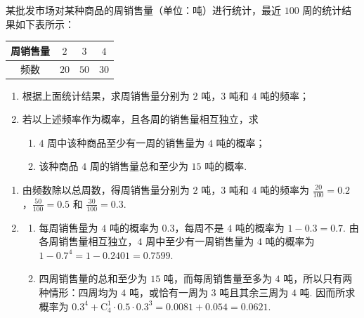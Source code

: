 \begin{problem}
某批发市场对某种商品的周销售量（单位：吨）进行统计，最近 \(100\text{ 周}\)的统计结果如下表所示：

\begin{center}
\begin{tabular}{c|ccc}
\hline
周销售量 & \(2\) & \(3\) & \(4\) \\
\hline
频数 & \(20\) & \(50\) & \(30\) \\
\hline
\end{tabular}
\end{center}

\begin{enumerate}
\item 根据上面统计结果，求周销售量分别为 \(2\text{ 吨}\)，\(3\text{ 吨}\)和 \(4\text{ 吨}\)的频率；
\item 若以上述频率作为概率，且各周的销售量相互独立，求
\begin{enumerate}
\item \(4\text{ 周}\)中该种商品至少有一周的销售量为 \(4\text{ 吨}\)的概率；
\item 该种商品 \(4\text{ 周}\)的销售量总和至少为 \(15\text{ 吨}\)的概率.
\end{enumerate}
\end{enumerate}
\end{problem}

\begin{solution}
\begin{enumerate}
\item 由频数除以总周数，得周销售量分别为 \(2\text{ 吨}\)，\(3\text{ 吨}\)和 \(4\text{ 吨}\)的频率为 \(\frac{20}{100}=0.2\)，\(\frac{50}{100}=0.5\) 和 \(\frac{30}{100}=0.3\).

\item
\begin{enumerate}
\item 每周销售量为 \(4\text{ 吨}\)的概率为 \(0.3\)，每周不是 \(4\text{ 吨}\)的概率为 \(1-0.3=0.7\). 由各周销售量相互独立，\(4\) 周中至少有一周销售量为 \(4\text{ 吨}\)的概率为 \(1-0.7^4=1-0.2401=0.7599\).

\item 四周销售量的总和至少为 \(15\text{ 吨}\)，而每周销售量至多为 \(4\text{ 吨}\)，所以只有两种情形：四周均为 \(4\text{ 吨}\)，或恰有一周为 \(3\text{ 吨}\)且其余三周为 \(4\text{ 吨}\). 因而所求概率为 \(0.3^4+\mathrm C_4^1\cdot0.5\cdot0.3^3=0.0081+0.054=0.0621\).
\end{enumerate}
\end{enumerate}
\end{solution}

